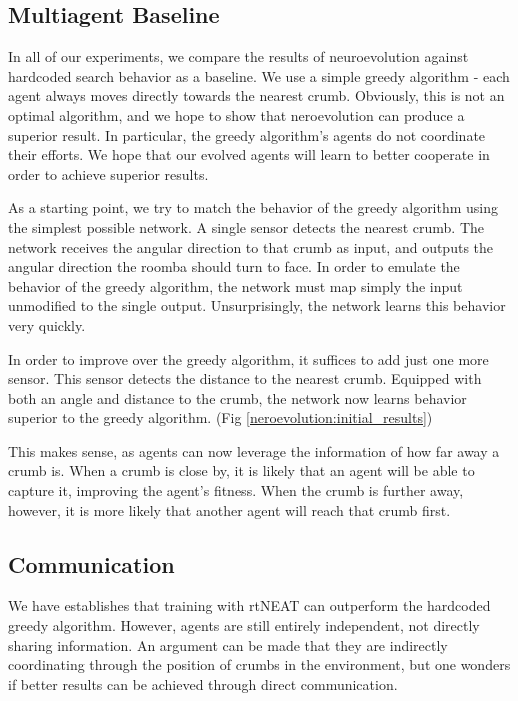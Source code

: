 \documentclass[conference]{IEEEtran}
\begin{document}
\subsection{Multiagent Baseline}

In all of our experiments, we compare the results of neuroevolution against hardcoded search behavior as a baseline. We use a simple greedy algorithm - each agent always moves directly towards the nearest crumb. Obviously, this is not an optimal algorithm, and we hope to show that neroevolution can produce a superior result. In particular, the greedy algorithm's agents do not coordinate their efforts. We hope that our evolved agents will learn to better cooperate in order to achieve superior results.

As a starting point, we try to match the behavior of the greedy algorithm using the simplest possible network. A single sensor detects the nearest crumb. The network receives the angular direction to that crumb as input, and outputs the angular direction the roomba should turn to face. In order to emulate the behavior of the greedy algorithm, the network must map simply the input unmodified to the single output. Unsurprisingly, the network learns this behavior very quickly.

In order to improve over the greedy algorithm, it suffices to add just one more sensor. This sensor detects the distance to the nearest crumb. Equipped with both an angle and distance to the crumb, the network now learns behavior superior to the greedy algorithm. (Fig \ref{neroevolution:initial_results})

This makes sense, as agents can now leverage the information of how far away a crumb is. When a crumb is close by, it is likely that an agent will be able to capture it, improving the agent's fitness. When the crumb is further away, however, it is more likely that another agent will reach that crumb first. 


\subsection{Communication}


We have establishes that training with rtNEAT can outperform the hardcoded greedy algorithm. However, agents are still entirely independent, not directly sharing information. An argument can be made that they are indirectly coordinating through the position of crumbs in the environment, but one wonders if better results can be achieved through direct communication.
\end{document}
